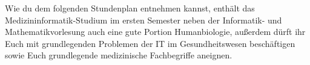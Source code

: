 Wie du dem folgenden Stundenplan entnehmen kannst, enthält das Medizininformatik-Studium im ersten Semester neben der Informatik- und Mathematikvorlesung auch eine gute Portion Humanbiologie, außerdem dürft ihr Euch mit grundlegenden Problemen der IT im Gesundheitswesen beschäftigen sowie Euch grundlegende medizinische Fachbegriffe aneignen.\\
\noindent\makebox[\textwidth][c]{%
	\setlength{\fboxrule}{4pt}
	\fcolorbox{red}{white}{
		\begin{minipage}[t]{
			\textwidth}\textbf{Achtung!} Die Daten für die Vorlesungstermine können sich noch ändern. Schau am besten auf Alma (\url{https://alma.uni-tuebingen.de/}), ob die Termine dort geupdatet wurden.
		\end{minipage}}}

